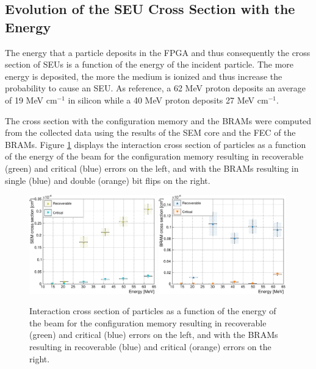     \subsection{Evolution of the SEU Cross Section with the Energy}

      The energy that a particle deposits in the FPGA and thus consequently the cross section of SEUs is a function of the energy of the incident particle. The more energy is deposited, the more the medium is ionized and thus increase the probability to cause an SEU. As reference, a 62 MeV proton deposits an average of 19 MeV cm$^{-1}$ in silicon while a 40 MeV proton deposits 27 MeV cm$^{-1}$.

      The cross section with the configuration memory and the BRAMs were computed from the collected data using the results of the SEM core and the FEC of the BRAMs. Figure \ref{fig:II-5-data-seu-energy} displays the interaction cross section of particles as a function of the energy of the beam for the configuration memory resulting in recoverable (green) and critical (blue) errors on the left, and with the BRAMs resulting in single (blue) and double (orange) bit flips on the right. \\

      \begin{figure}[h!]
        \centering
        \includegraphics[width=0.49\textwidth]{img/plots/cE_SEM-crop}
        \includegraphics[width=0.49\textwidth]{img/plots/cE_BRAM-crop}
        \caption{Interaction cross section of particles as a function of the energy of the beam for the configuration memory resulting in recoverable (green) and critical (blue) errors on the left, and with the BRAMs resulting in recoverable (blue) and critical (orange) errors on the right.}
        \label{fig:II-5-data-seu-energy}
      \end{figure}

